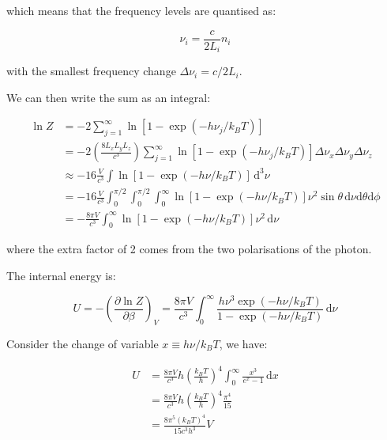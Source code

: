 \documentclass[12pt]{article}
\begin{document}
which means that the frequency levels are quantised as:

\begin{equation}
    \nu_{i} = \frac{c}{2L_{i}} n_{i}
\end{equation}

with the smallest frequency change $\Delta \nu_{i} = c/2L_{i}$.

We can then write the sum as an integral:

\begin{equation}
    \begin{split}
        \ln{Z} &= -2 \sum_{j = 1}^{\infty} \ln{\left[ 1 - \exp\left( -h \nu_{j}/k_{B}T \right) \right]} \\
        &= -2 \left( \frac{8L_{x}L_{y}L_{z}}{c^{3}} \right) \sum_{j = 1}^{\infty} \ln{\left[ 1 - \exp\left( -h \nu_{j}/k_{B}T \right) \right]} \Delta \nu_{x} \Delta \nu_{y} \Delta \nu_{z} \\
        &\approx -16\frac{V}{c^{3}} \int \ln{\left[ 1 - \exp\left( -h \nu/k_{B}T \right) \right]} \, \mathrm{d}^{3}\nu \\
        &= -16\frac{V}{c^{3}} \int_{0}^{\pi/2} \int_{0}^{\pi/2} \int_{0}^{\infty} \ln{\left[ 1 - \exp\left( -h \nu/k_{B}T \right) \right]} \nu^{2} \sin{\theta} \, \mathrm{d}\nu \mathrm{d}\theta \mathrm{d}\phi \\
        &= -\frac{8\pi V}{c^{3}} \int_{0}^{\infty} \ln{\left[ 1 - \exp\left( -h \nu/k_{B}T \right) \right]} \nu^{2} \, \mathrm{d}\nu
    \end{split}
\end{equation}

where the extra factor of 2 comes from the two polarisations of the photon.

The internal energy is:

\begin{equation}
    U = -\left( \frac{\partial \ln{Z}}{\partial \beta} \right)_{V} = \frac{8\pi V}{c^{3}} \int_{0}^{\infty} \frac{h \nu^{3} \exp\left( -h \nu/k_{B}T \right)}{1 - \exp\left( -h \nu/k_{B}T \right)} \, \mathrm{d}\nu
\end{equation}

Consider the change of variable $x \equiv h\nu/k_{B}T$, we have:

\begin{equation}
    \begin{split}
        U &= \frac{8\pi V}{c^{3}} h \left( \frac{k_{B}T}{h} \right)^{4} \int_{0}^{\infty} \frac{x^{3}}{e^{x} - 1} \, \mathrm{d}x \\
        &= \frac{8\pi V}{c^{3}} h \left( \frac{k_{B}T}{h} \right)^{4} \frac{\pi^{4}}{15} \\
        &= \frac{8\pi^{5} (k_{B}T)^{4}}{15c^{3} h^{3}} V
    \end{split}
\end{equation}
\end{document}
